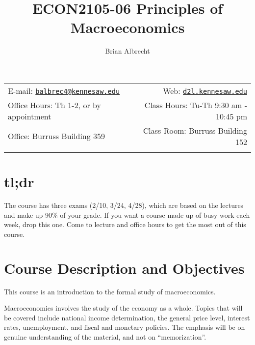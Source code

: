 \documentclass[11pt,]{article}
\title{ECON2105-06 Principles of Macroeconomics}
\author{Brian Albrecht}
\date{}
\begin{document}
  

		\maketitle
		
	
		\thispagestyle{firststyle}



	\noindent \begin{tabular*}{\textwidth}{ @{\extracolsep{\fill}} lr @{\extracolsep{\fill}}}


E-mail: \texttt{\href{mailto:balbrec4@kennesaw.edu}{\nolinkurl{balbrec4@kennesaw.edu}}} & Web: \href{http://d2l.kennesaw.edu}{\tt d2l.kennesaw.edu}\\
Office Hours: Th 1-2, or by appointment  &  Class Hours: Tu-Th 9:30 am - 10:45 pm\\
Office: Burruss Building 359  & Class Room: Burruss Building 152\\
	&  \\
	\hline
	\end{tabular*}
	
\vspace{2mm}
	


\hypertarget{tldr}{%
\section{tl;dr}\label{tldr}}

The course has three exams (2/10, 3/24, 4/28), which are based on the lectures and make up 90\% of your grade. If you want a course made up of busy work each week, drop this one. Come to lecture and office hours to get the most out of this course.

\hypertarget{course-description-and-objectives}{%
\section*{Course Description and Objectives}\label{course-description-and-objectives}}

This course is an introduction to the formal study of macroeconomics.

Macroeconomics involves the study of the economy as a whole. Topics that will be covered include national
income determination, the general price level, interest rates, unemployment, and fiscal and monetary policies.
The emphasis will be on genuine understanding of the material, and not on ``memorization''.
\end{document}
